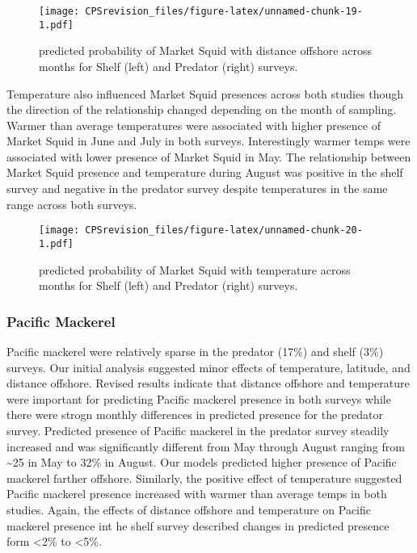 \documentclass[
]{article}
\begin{document}
\begin{figure}
\centering
\texttt{[image: CPSrevision\_files/figure-latex/unnamed-chunk-19-1.pdf]}
\caption{predicted probability of Market Squid with distance offshore
across months for Shelf (left) and Predator (right) surveys.}
\end{figure}

Temperature also influenced Market Squid presences across both studies
though the direction of the relationship changed depending on the month
of sampling. Warmer than average temperatures were associated with
higher presence of Market Squid in June and July in both surveys.
Interestingly warmer temps were associated with lower presence of Market
Squid in May. The relationship between Market Squid presence and
temperature during August was positive in the shelf survey and negative
in the predator survey despite temperatures in the same range across
both surveys.

\begin{figure}
\centering
\texttt{[image: CPSrevision\_files/figure-latex/unnamed-chunk-20-1.pdf]}
\caption{predicted probability of Market Squid with temperature across
months for Shelf (left) and Predator (right) surveys.}
\end{figure}

\hypertarget{pacific-mackerel-1}{%
\subsubsection{Pacific Mackerel}\label{pacific-mackerel-1}}

Pacific mackerel were relatively sparse in the predator (17\%) and shelf
(3\%) surveys. Our initial analysis suggested minor effects of
temperature, latitude, and distance offshore. Revised results indicate
that distance offshore and temperature were important for predicting
Pacific mackerel presence in both surveys while there were strogn
monthly differences in predicted presence for the predator survey.
Predicted presence of Pacific mackerel in the predator survey steadily
increased and was significantly different from May through August
ranging from \textasciitilde25 in May to 32\% in August. Our models
predicted higher presence of Pacific mackerel farther offshore.
Similarly, the positive effect of temperature suggested Pacific mackerel
presence increased with warmer than average temps in both studies.
Again, the effects of distance offshore and temperature on Pacific
mackerel presence int he shelf survey described changes in predicted
presence form \textless2\% to \textless5\%.
\end{document}
